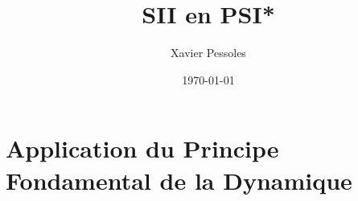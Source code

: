 \documentclass[
	fontsize=10pt, %
	twoside=true, %
]{kaobook}
\newcommand{\repRel}{../../..}
\newcommand{\repStyle}{\repRel/Style}
\begin{document}

\titlehead{Document Template}
\title[SII en PSI*]{SII en PSI*}
\author[XP]{Xavier Pessoles}
\date{\today}

%
\frontmatter %
%

%

%
\mainmatter %



\setcounter{margintocdepth}{\sectiontocdepth}
\marginlayout
\graphicspath{{\repStyle/png}}

\pagestyle{xp.scrheadings}


%



\newcommand{\repExo}{Application_01_ROV}
\newcommand{\nomExo}{Application_01_ROV}

\livrettrue %
\collefalse



\setcounter{chapter}{8}


\setchapterpreamble[u]{\margintoc}

\chapter{Application du Principe Fondamental de la Dynamique}

\normaltrue

%

%
\end{document}
